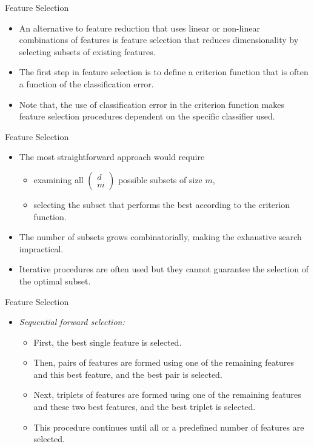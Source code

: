\begin{frame}{Feature Selection}
\begin{itemize}
\item An alternative to feature reduction that uses linear or
non-linear combinations of features is feature selection that
reduces dimensionality by selecting subsets of existing
features.
\item The first step in feature selection is to define a criterion
function that is often a function of the classification error.
\item Note that, the use of classification error in the criterion function makes feature selection procedures dependent on
the specific classifier used.
\end{itemize}
\end{frame}

\begin{frame}{Feature Selection}
\begin{itemize}
\item The most straightforward approach would require
\begin{itemize}
\item examining all $\left( {\begin{array}{*{20}{c}}
d\\
m
\end{array}} \right)$ possible subsets of size $m$,
\item selecting the subset that performs the best according to the criterion function.
\end{itemize}
\item The number of subsets grows combinatorially, making the
exhaustive search impractical.
\item Iterative procedures are often used but they cannot
guarantee the selection of the optimal subset.
\end{itemize}
\end{frame}

\begin{frame}{Feature Selection}
\begin{itemize}
\item \textit{\color{mycolor2}Sequential forward selection:}
\begin{itemize}
\item First, the best single feature is selected.
\item Then, pairs of features are formed using one of the
remaining features and this best feature, and the best pair is
selected.
\item Next, triplets of features are formed using one of the
remaining features and these two best features, and the best
triplet is selected.
\item This procedure continues until all or a predefined number of features are selected.
\end{itemize}
\end{itemize}
\end{frame}

